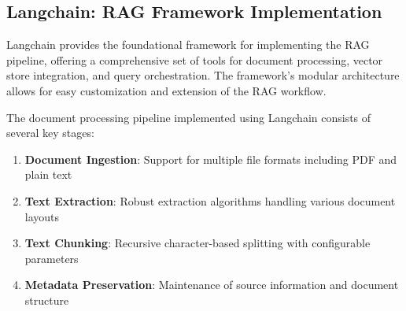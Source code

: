 \documentclass[12pt,letterpaper]{article}
\begin{document}
\begin{table}[H]
    \centering
    \caption{Selected LLMs and their performance characteristics in this project}
\end{table}

\subsection{Langchain: RAG Framework Implementation}

Langchain provides the foundational framework for implementing the RAG pipeline, offering a comprehensive set of tools for document processing, vector store integration, and query orchestration. The framework's modular architecture allows for easy customization and extension of the RAG workflow.

The document processing pipeline implemented using Langchain consists of several key stages:

\begin{enumerate}
    \item \textbf{Document Ingestion}: Support for multiple file formats including PDF and plain text
    \item \textbf{Text Extraction}: Robust extraction algorithms handling various document layouts
    \item \textbf{Text Chunking}: Recursive character-based splitting with configurable parameters
    \item \textbf{Metadata Preservation}: Maintenance of source information and document structure
\end{enumerate}
\end{document}
